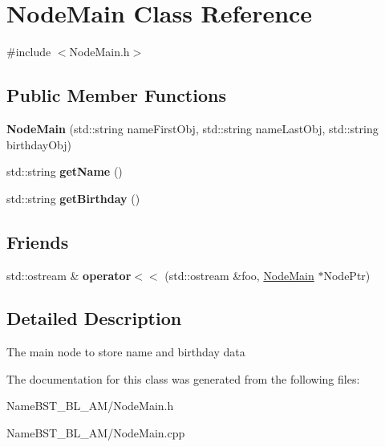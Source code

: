\hypertarget{class_node_main}{}\section{Node\+Main Class Reference}
\label{class_node_main}


{\ttfamily \#include $<$Node\+Main.\+h$>$}

\subsection*{Public Member Functions}
\begin{DoxyCompactItemize}
\item 
\mbox{\label{class_node_main_a61c13db0781ce67d40c980dc5e5167e8}} 
{\bfseries Node\+Main} (std\+::string name\+First\+Obj, std\+::string name\+Last\+Obj, std\+::string birthday\+Obj)
\item 
\mbox{\label{class_node_main_ab2a322039546740a6ee4dc889c1af6ce}} 
std\+::string {\bfseries get\+Name} ()
\item 
\mbox{\label{class_node_main_a92b3f0b8de146421da6067f5272135d8}} 
std\+::string {\bfseries get\+Birthday} ()
\end{DoxyCompactItemize}
\subsection*{Friends}
\begin{DoxyCompactItemize}
\item 
\mbox{\label{class_node_main_a08a4c89d1f32549a5932c7f355e54759}} 
std\+::ostream \& {\bfseries operator$<$$<$} (std\+::ostream \&foo, \hyperlink{class_node_main}{Node\+Main} $\ast$Node\+Ptr)
\end{DoxyCompactItemize}


\subsection{Detailed Description}
The main node to store name and birthday data 

The documentation for this class was generated from the following files\+:\begin{DoxyCompactItemize}
\item 
Name\+B\+S\+T\+\_\+\+B\+L\+\_\+\+A\+M/Node\+Main.\+h\item 
Name\+B\+S\+T\+\_\+\+B\+L\+\_\+\+A\+M/Node\+Main.\+cpp\end{DoxyCompactItemize}
